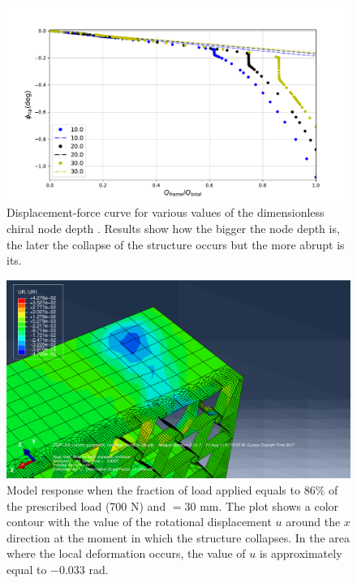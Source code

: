       \begin{figure}[!htpb] %
        \centering
        \includegraphics[width=0.8 \textwidth]{../figures/result-sim/B/force_displacement-far}
        \caption[Displacement-force curve for various values of the dimensionless chiral node depth]{Displacement-force curve for various values of the dimensionless chiral node depth \chiB. Results show how the bigger the node depth \chiB is, the later the collapse of the structure occurs but the more abrupt is its.}\label{fig:forceDisplacement-far-B}
      \end{figure}

      \begin{figure}[!htpb] %
        \centering
        \includegraphics[width=0.8 \textwidth]{../figures/result-sim/B/30_UR1}
        \caption[Model response when the fraction of load applied equals to 86\% of the prescribed load (700 N) and \chiB$= 30$ mm]{Model response when the fraction of load applied equals to 86\% of the prescribed load (700 N) and \chiB$= 30$ mm. The plot shows a color contour with the value of the rotational displacement $u$ around the $x$ direction at the moment in which the structure collapses. In the area where the local deformation occurs, the value of $u$ is approximately equal to $-0.033$ rad.}
        \label{fig:30_UR1}
      \end{figure}

